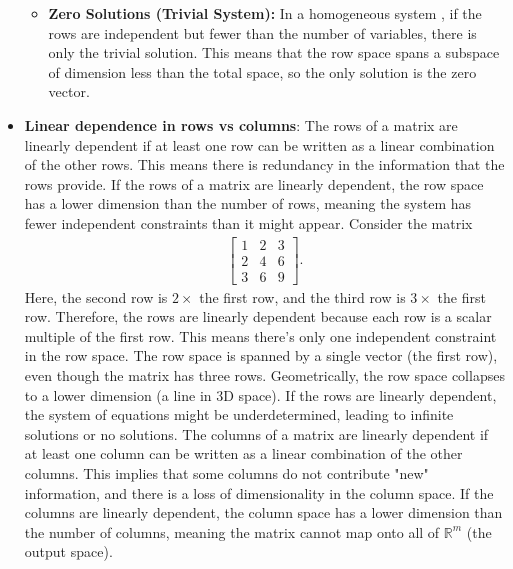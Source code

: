 \documentclass{report}
\begin{document}
\begin{itemize}
\begin{itemize}
            \item \textbf{Zero Solutions (Trivial System):} In a homogeneous system , if the rows are independent but fewer than the number of variables, there is only the trivial solution. This means that the row space spans a subspace of dimension less than the total space, so the only solution is the zero vector.
        \end{itemize}
    \item \textbf{Linear dependence in rows vs columns}:
        The rows of a matrix are linearly dependent if at least one row can be written as a linear combination of the other rows.
        \bigbreak \noindent 
        This means there is redundancy in the information that the rows provide.
        \bigbreak \noindent 
        If the rows of a matrix are linearly dependent, the row space has a lower dimension than the number of rows, meaning the system has fewer independent constraints than it might appear.
        \bigbreak \noindent 
        Consider the matrix
        \begin{align*}
            \begin{bmatrix} 1 & 2 & 3 \\ 2 & 4 & 6 \\ 3 & 6 & 9 \end{bmatrix}
        .\end{align*}
        \bigbreak \noindent 
        Here, the second row is $2\times$ the first row, and the third row is $3\times$ the first row. Therefore, the rows are linearly dependent because each row is a scalar multiple of the first row.
        \bigbreak \noindent 
        This means there’s only one independent constraint in the row space. The row space is spanned by a single vector (the first row), even though the matrix has three rows. Geometrically, the row space collapses to a lower dimension (a line in 3D space).
        \bigbreak \noindent 
        If the rows are linearly dependent, the system of equations might be underdetermined, leading to infinite solutions or no solutions.
        \bigbreak \noindent 
        The columns of a matrix are linearly dependent if at least one column can be written as a linear combination of the other columns.
        \bigbreak \noindent 
        This implies that some columns do not contribute "new" information, and there is a loss of dimensionality in the column space.
        \bigbreak \noindent 
        If the columns are linearly dependent, the column space has a lower dimension than the number of columns, meaning the matrix cannot map onto all of $\mathbb{R}^{m}$ (the output space).

\end{itemize}
\end{document}
